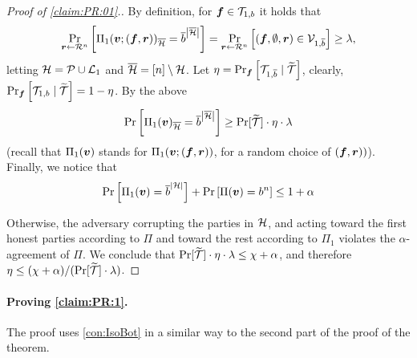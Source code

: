 \begin{proof}[Proof of \cref{claim:PR:01}.]
By definition, for $\vf \in \cT_{1,\o}$ it holds that
\begin{align*}
\ppr{\vr \gets \rn}{\Pi_1(\vv;(\vf,\vr))_\oH = \oo^{\size{\oH}} } = \ppr{\vr \gets \rn}{(\vf,\emptyset,\vr) \in \cV_{1,\oo} } \ge \lambda,
\end{align*}
letting $\cH = \cP \cup \cL_1$ and $\oH = [n] \setminus\cH$. Let $\eta = \ppr{\vf}{\cT_{1,\oo} \mid \tT}$, clearly,	$\ppr{\vf}{\cT_{1,\o} \mid \tT} = 1 -\eta$. By the above
\begin{align}
 \pr{\Pi_1(\vv)_\oH = \oo^{\size{\oH}}} \ge \Pr[\tT]\cdot \eta \cdot \lambda
\end{align}
(recall that $\Pi_1(\vv)$ stands for $\Pi_1(\vv;(\vf,\vr))$, for a random choice of $(\vf,\vr))$).
Finally, we notice that
\begin{align}
\pr{\Pi_1(\vv) = \oo^{\size{\cH}}} + \pr{\Pi(\vv) = \o^n} \le 1+ \alpha
\end{align}

Otherwise, the adversary corrupting the parties in $\cH$, and acting toward the first honest parties according to $\Pi$ and toward the rest according to $\Pi_1$ violates the $\alpha$-agreement of $\Pi$. We conclude that $\Pr[\tT]\cdot \eta \cdot \lambda \le \chi + \alpha $, and therefore $\eta \le (\chi + \alpha)/(\Pr[\tT]\cdot \lambda)$.
\end{proof}

\paragraph{Proving \cref{claim:PR:1}.}

The proof uses \cref{con:IsoBot} in a similar way to the second part of the proof of the theorem.

